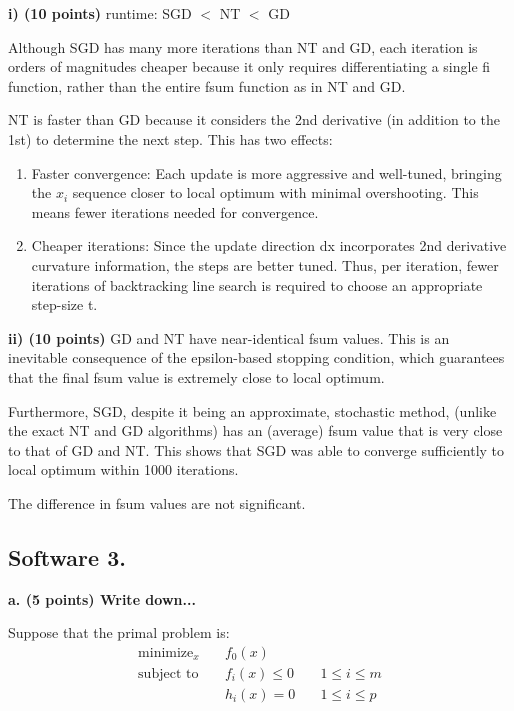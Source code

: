 \documentclass[a4paper,10pt]{article}
\theoremstyle{definition}
\begin{document}
\textbf{i) (10 points)}
runtime: SGD $<$ NT $<$ GD

Although SGD has many more iterations than NT and GD, each iteration is
orders of magnitudes cheaper because it only requires differentiating a single fi function,
rather than the entire fsum function as in NT and GD.

NT is faster than GD because it considers the 2nd derivative (in addition to the 1st) to
determine the next step. This has two effects:
\begin{enumerate}
    \item Faster convergence: Each update is more aggressive and well-tuned, 
        bringing the $x_i$ sequence closer to local optimum with minimal overshooting. 
        This means fewer iterations needed for convergence.
    \item Cheaper iterations: Since the update direction dx incorporates 2nd derivative curvature
information, the steps are better tuned. Thus, per iteration, fewer iterations of backtracking
line search is required to choose an appropriate step-size t.
\end{enumerate}

\textbf{ii) (10 points)}
GD and NT have near-identical fsum values.
This is an inevitable consequence of the epsilon-based stopping condition,
which guarantees that the final fsum value is extremely close to local optimum.

Furthermore, SGD, despite it being an approximate, stochastic method, (unlike
the exact NT and GD algorithms) has an (average) fsum value that is very
close to that of GD and NT. This shows that SGD was able to converge sufficiently
to local optimum within 1000 iterations.

The difference in fsum values are not significant.

\subsection*{Software 3. }

\textbf{a. (5 points) Write down...}

Suppose that the primal problem is:
\[
\begin{aligned}
    \text{minimize}_{x} \quad & f_0(x) \\
    \text{subject to} \quad & f_i(x) \leq 0 \quad & 1 \leq i \leq m\\
                            & h_i(x) = 0    \quad & 1 \leq i \leq p 
\end{aligned}
\]
\end{document}
